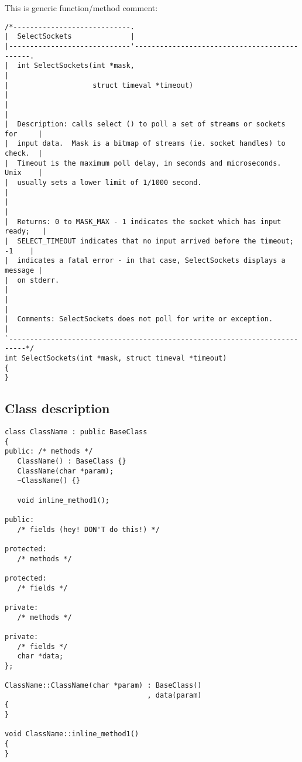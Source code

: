 \documentclass[onecolumn]{article}
\begin{document}
\par This is generic function/method comment:

\small
\begin{verbatim}
/*----------------------------.
|  SelectSockets              |
|-----------------------------'---------------------------------------------.
|  int SelectSockets(int *mask,                                             |
|                    struct timeval *timeout)                               |
|                                                                           |
|  Description: calls select () to poll a set of streams or sockets for     |
|  input data.  Mask is a bitmap of streams (ie. socket handles) to check.  |
|  Timeout is the maximum poll delay, in seconds and microseconds.  Unix    |
|  usually sets a lower limit of 1/1000 second.                             |
|                                                                           |
|  Returns: 0 to MASK_MAX - 1 indicates the socket which has input ready;   |
|  SELECT_TIMEOUT indicates that no input arrived before the timeout; -1    |
|  indicates a fatal error - in that case, SelectSockets displays a message |
|  on stderr.                                                               |
|                                                                           |
|  Comments: SelectSockets does not poll for write or exception.            |
`--------------------------------------------------------------------------*/
int SelectSockets(int *mask, struct timeval *timeout)
{
}
\end{verbatim}
\normalsize


\subsection{Class description}

\small
\begin{verbatim}
class ClassName : public BaseClass
{
public: /* methods */
   ClassName() : BaseClass {}
   ClassName(char *param);
   ~ClassName() {}

   void inline_method1();

public:
   /* fields (hey! DON'T do this!) */

protected:
   /* methods */

protected:
   /* fields */

private:
   /* methods */

private:
   /* fields */
   char *data;
};

ClassName::ClassName(char *param) : BaseClass()
                                  , data(param)
{
}

void ClassName::inline_method1()
{
}
\end{verbatim}
\normalsize
\end{document}
